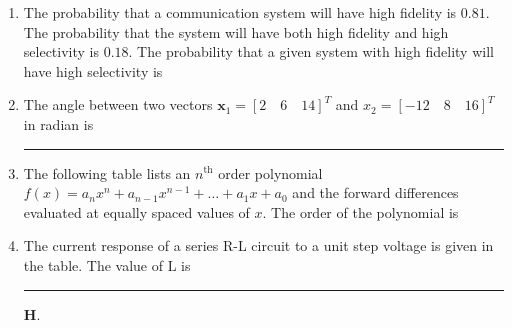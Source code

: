 \documentclass[journal,12pt,onecolumn]{IEEEtran}
\theoremstyle{remark}
\begin{document}
\begin{enumerate}
\item The probability that a communication system will have high fidelity is $0.81$. The probability that the system will have both high fidelity and high selectivity is $0.18$. The probability that a given system with high fidelity will have high selectivity is \par \hfill{}
\begin{enumerate}
\end{enumerate}

\item The angle between two vectors $\textbf{x}_1 = [2\quad 6\quad 14]^T$ and $x_2 = [-12\quad 8\quad 16]^T$ in radian is \rule{1.5cm}{0.4pt} 
\par \hfill{}

\item The following table lists an $n^\text{th}$ order polynomial $f(x) = a_n x^n + a_{n-1} x^{n-1} + \dots + a_1 x + a_0$ and the forward differences evaluated at equally spaced values of $x$. The order of the polynomial is \par \hfill{}

\begin{table}[H]
    \centering
    
\end{table}

\begin{enumerate}
\end{enumerate}

\item The current response of a series R-L circuit to a unit step voltage is given in the table. The value of $\text{L}$ is \rule{1.5cm}{0.4pt} \textbf{H}. \par \hfill{}
\begin{table}[H]
    \centering
    
\end{table}


\end{enumerate}
\end{document}
